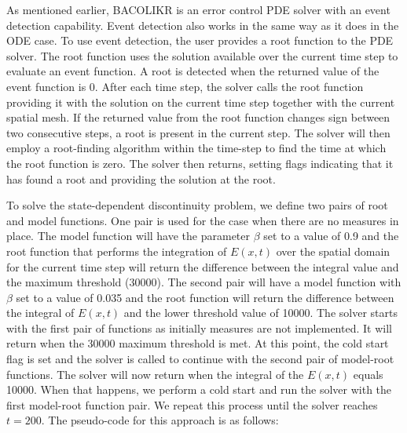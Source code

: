 As mentioned earlier, BACOLIKR is an error control PDE solver with an event detection capability. Event detection also works in the same way as it does in the ODE case. To use event detection, the user provides a root function to the PDE solver. The root function uses the solution available over the current time step to evaluate an event function. A root is detected when the returned value of the event function is 0. After each time step, the solver calls the root function providing it with the solution on the current time step together with the current spatial mesh. If the returned value from the root function changes sign between two consecutive steps, a root is present in the current step. The solver will then employ a root-finding algorithm within the time-step to find the time at which the root function is zero. The solver then returns, setting flags indicating that it has found a root and providing the solution at the root. 

To solve the state-dependent discontinuity problem, we define two pairs of root and model functions. One pair is used for the case when there are no measures in place. The model function will have the parameter $\beta$ set to a value of 0.9 and the root function that performs the integration of $E(x, t)$ over the spatial domain for the current time step will return the difference between the integral value and the maximum threshold (30000). The second pair will have a model function with $\beta$ set to a value of 0.035 and the root function will return the difference between the integral of $E(x, t)$ and the lower threshold value of 10000. The solver starts with the first pair of functions as initially measures are not implemented. It will return when the 30000 maximum threshold is met. At this point, the cold start flag is set and the solver is called to continue with the second pair of model-root functions. The solver will now return when the integral of the $E(x, t)$ equals 10000. When that happens, we perform a cold start and run the solver with the first model-root function pair. We repeat this process until the solver reaches $t=200$. The pseudo-code for this approach is as follows:

